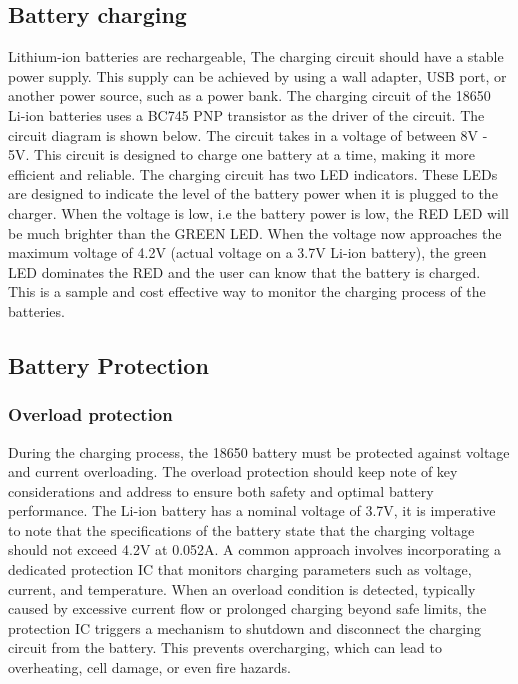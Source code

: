 \documentclass[class=report,11pt,crop=false]{standalone}
\begin{document}
	\subsection{Battery charging}
	\vspace{0.5cm}
	Lithium-ion batteries are rechargeable,  The charging circuit should have a stable power supply. This supply can be achieved  by using a wall adapter, USB port, or another power source, such as a power bank. The charging circuit of the 18650 Li-ion batteries uses a BC745 PNP transistor as the driver of the circuit. The circuit diagram is shown below. The circuit takes in a voltage of between 8V - 5V. This circuit is designed to charge one battery at a time, making it more efficient and reliable. The charging circuit has two LED indicators. These LEDs are designed to indicate the level of the battery power when it is plugged to the charger. When the voltage is low, i.e the battery power is low, the RED LED will be much brighter than the GREEN LED. When the voltage now approaches the maximum voltage of 4.2V (actual voltage on a 3.7V Li-ion battery), the green LED dominates the RED and the user can know that the battery is charged. This is a sample and cost effective way to monitor the charging process of the batteries.  
	
	\vspace{0.5cm}
	
	\subsection{Battery Protection}
	\vspace{0.5cm}
	
	\subsubsection{Overload protection}
	\vspace{0.5cm}
	During the charging process, the 18650 battery must be protected against voltage and current overloading. The overload protection should keep note of key considerations and address to ensure both safety and optimal battery performance. The Li-ion battery has a nominal voltage of 3.7V, it is imperative to note that the specifications of the battery state that the charging voltage should not exceed 4.2V at 0.052A. A common approach involves incorporating a dedicated protection IC that monitors charging parameters such as voltage, current, and temperature. When an overload condition is detected, typically caused by excessive current flow or prolonged charging beyond safe limits, the protection IC triggers a mechanism to shutdown and disconnect the charging circuit from the battery. This prevents overcharging, which can lead to overheating, cell damage, or even fire hazards.
	
\end{document}
